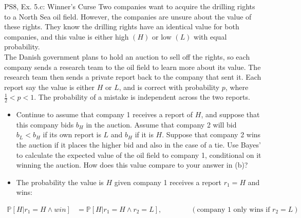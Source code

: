 \begin{frame}{PS8, Ex. 5.c: Winner's Curse}
      Two companies want to acquire the drilling rights to a North Sea oil field. However, the companies are unsure about the value of these rights. They know the drilling rights have an identical value for both companies, and this value is either high $(H)$ or low $(L)$ with equal probability.\\\smallskip
      The Danish government plans to hold an auction to sell off the rights, so each company sends a research team to the oil field to learn more about its value. The research team then sends a private report back to the company that sent it. Each report say the value is either $H$ or $L$, and is correct with probability $p$, where $\frac{1}{2} < p < 1$. The probability of a mistake is independent across the two reports.
      \vspace{-2pt}
      \begin{itemize}
        \item[(c)] Continue to assume that company 1 receives a report of $H$, and suppose that this company bids $b_H$ in the auction. Assume that company 2 will bid $b_L < b_H$ if its own report is $L$ and $b_H$ if it is $H$. Suppose that company 2 wins the auction if it places the higher bid and also in the case of a tie. Use Bayes’ to calculate the expected value of the oil field to company 1, conditional on it winning the auction. How does this value compare to your answer in (b)?
        \item[Step 1:] The probability the value is $H$ given company 1 receives a report $r_1=H$ and wins:
        \end{itemize}
        \vspace{-8pt}
        \begin{align*}
          \mathbb{P}[H|r_1=H\wedge win]&=\mathbb{P}[H|r_1=H\wedge r_2=L],\quad\quad\quad\quad(\text{company 1 only wins if }r_2=L)
        \end{align*}
      \vfill\null
\end{frame}

